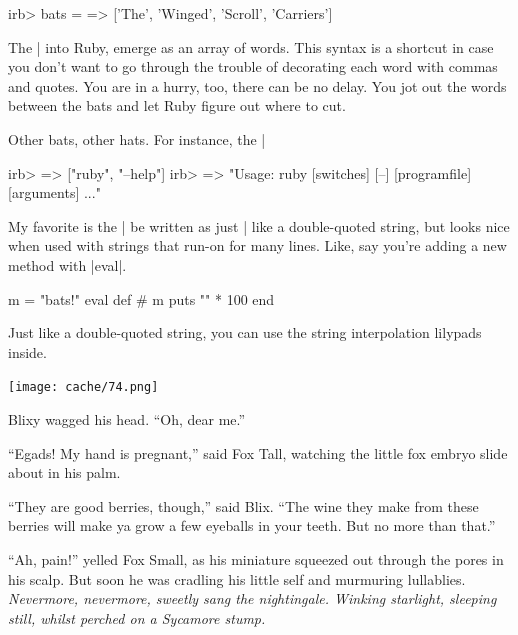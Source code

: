 \documentclass[12pt,twoside]{report}
\begin{document}
\begin{consolecode}

 irb> bats = %
   => ['The', 'Winged', 'Scroll', 'Carriers']

\end{consolecode}


The \rubyinline|%
into Ruby, emerge as an array of words.  This syntax is a shortcut in
case you don't want to go through the trouble of decorating each word
with commas and quotes.  You are in a hurry, too, there can be no
delay.  You jot out the words between the bats and let Ruby figure out
where to cut.

Other bats, other hats.  For instance, the
\rubyinline|%


\begin{consolecode}

 irb> %
   => ["ruby", "--help"]
 irb> %
   => "Usage: ruby [switches] [--] [programfile] [arguments] ..."

\end{consolecode}


My favorite is the \rubyinline|%
be written as just \rubyinline|%
like a double-quoted string, but looks nice when used with strings
that run-on for many lines.  Like, say you're adding a new method with
\rubyinline|eval|.


\begin{consolecode}

 m = "bats!"
 eval %
   def #{ m }
     puts "{" * 100
   end
 }

\end{consolecode}


Just like a double-quoted string, you can use the string interpolation
lilypads inside.

	\texttt{[image: cache/74.png]}

Blixy wagged his head.  ``Oh, dear me.''

``Egads! My hand is pregnant,'' said Fox Tall, watching the little fox
embryo slide about in his palm.

``They are good berries, though,'' said Blix.  ``The wine they make
from these berries will make ya grow a few eyeballs in your teeth.
But no more than that.''

``Ah, pain!'' yelled Fox Small, as his miniature squeezed out through
the pores in his scalp.  But soon he was cradling his little self and
murmuring lullablies.  {\em Nevermore, nevermore, sweetly sang the
  nightingale.  Winking starlight, sleeping still, whilst perched on a
  Sycamore stump.}
\end{document}
